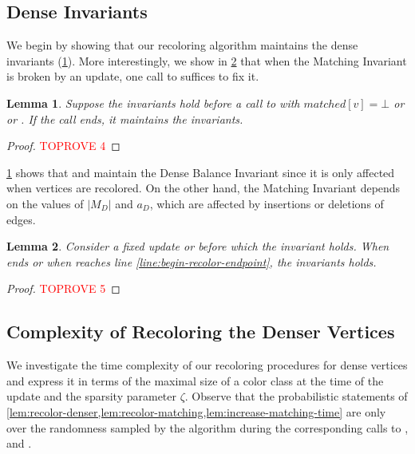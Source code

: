\documentclass[a4paper,english,11pt]{amsart}
\newtheorem{lemma}{Lemma}[section]
\theoremstyle{definition}
\begin{document}
\subsection{Dense Invariants}
\label{sec:invariants}

We begin by showing that our recoloring algorithm maintains the dense invariants (\cref{lem:recolor-denser-matching-invariants}). More interestingly, we show in \cref{lem:matching-inv} that when the Matching Invariant is broken by an update, one call to \AddAntiEdgeMatching suffices to fix it.


\begin{lemma}
    \label{lem:recolor-denser-matching-invariants}
    Suppose the invariants hold before a call to  with $matched[v]=\bot$ or  or . If the call ends, it maintains the invariants.
\end{lemma}
\begin{proof}\textcolor{red}{TOPROVE 4}\end{proof}

\cref{lem:recolor-denser-matching-invariants} shows that \RecolorInsert and \RecolorDelete maintain the Dense Balance Invariant since it is only affected when vertices are recolored. On the other hand, the Matching Invariant depends on the values of $|M_D|$ and $a_D$, which are affected by insertions or deletions of edges.
\begin{lemma}
    \label{lem:matching-inv}
    Consider a fixed update  or  before which the invariant holds. When  ends or when  reaches line \ref{line:begin-recolor-endpoint}, the invariants holds.
\end{lemma}

\begin{proof}\textcolor{red}{TOPROVE 5}\end{proof}

\subsection{Complexity of Recoloring the Denser Vertices}
\label{sec:denser}

We investigate the time complexity of our recoloring procedures for dense vertices and express it
in terms of the maximal size of a color class at the time of the update and the sparsity parameter $\zeta$. Observe that the probabilistic statements of \cref{lem:recolor-denser,lem:recolor-matching,lem:increase-matching-time} are only over the randomness sampled by the algorithm during the corresponding calls to \RecolorDense, \RecolorMatching and \AddAntiEdgeMatching.
\end{document}
